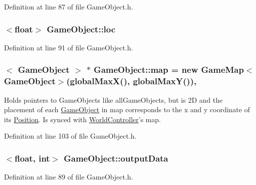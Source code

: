 Definition at line 87 of file Game\-Object.\-h.

\hypertarget{class_game_object_a6858e668e7d2c5ded850b952aaacd905}{
\subsubsection[{loc}]{$<$float$>$ Game\-Object\-::loc\hspace{0.3cm}{\ttfamily [protected]}}}\label{class_game_object_a6858e668e7d2c5ded850b952aaacd905}


Definition at line 91 of file Game\-Object.\-h.

\hypertarget{class_game_object_a5043adc801cf04c0747a0cdf93997d45}{
\subsubsection[{map}]{$<$ {\bf Game\-Object} $>$ $\ast$ Game\-Object\-::map = new {\bf Game\-Map}$<${\bf Game\-Object}$>$({\bf global\-Max\-X}(), {\bf global\-Max\-Y}())\hspace{0.3cm}{\ttfamily [static]}, {\ttfamily [protected]}}}\label{class_game_object_a5043adc801cf04c0747a0cdf93997d45}
Holds pointers to Game\-Objects like all\-Game\-Objects, but is 2\-D and the placement of each \hyperlink{class_game_object}{Game\-Object} in map corresponds to the x and y coordinate of its \hyperlink{struct_position}{Position}. Is synced with \hyperlink{class_world_controller}{World\-Controller}'s map. 

Definition at line 103 of file Game\-Object.\-h.

\hypertarget{class_game_object_a05d328553084cd1f480a26985a4671b5}{
\subsubsection[{output\-Data}]{$<$float, int$>$ Game\-Object\-::output\-Data\hspace{0.3cm}{\ttfamily [protected]}}}\label{class_game_object_a05d328553084cd1f480a26985a4671b5}


Definition at line 89 of file Game\-Object.\-h.

